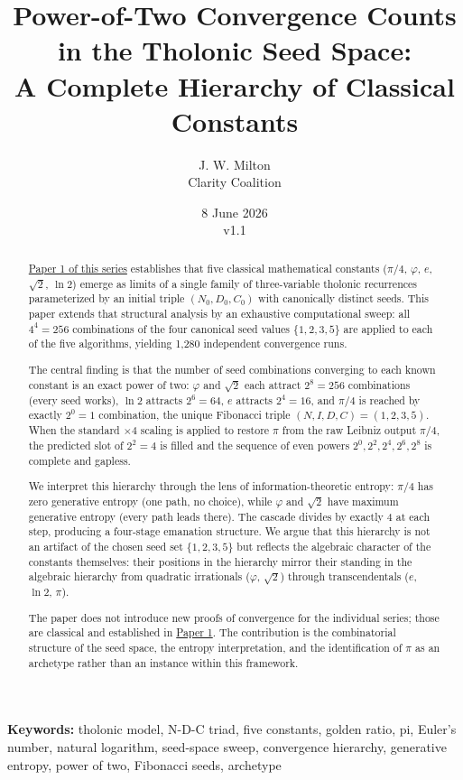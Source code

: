 \documentclass[12pt]{article}
\title{Power-of-Two Convergence Counts in the Tholonic Seed Space:\\
\large A Complete Hierarchy of Classical Constants}
\author{J. W. Milton\\[4pt]{\small Clarity Coalition}}
\date{\small 8 June 2026 \\ v1.1}
\begin{document}
\maketitle

\noindent\textbf{Keywords:} tholonic model, N-D-C triad, five constants, golden ratio, pi, Euler's number, natural logarithm, seed-space sweep, convergence hierarchy, generative entropy, power of two, Fibonacci seeds, archetype

\begin{abstract}
\href{https://github.com/baardev/truevalue/blob/main/docnav/Research/papers/1_recursive-tholonic-five-constants/1_recursive-tholonic-five-constants.pdf}{Paper
1 of this series} establishes that five classical mathematical constants
(\(\pi/4\), \(\varphi\), \(e\), \(\sqrt{2}\), \(\ln 2\)) emerge as
limits of a single family of three-variable tholonic recurrences
parameterized by an initial triple \((N_0, D_0, C_0)\) with canonically
distinct seeds. This paper extends that structural analysis by an
exhaustive computational sweep: all \(4^4 = 256\) combinations of the
four canonical seed values \(\{1, 2, 3, 5\}\) are applied to each of the
five algorithms, yielding 1,280 independent convergence runs.

The central finding is that the number of seed combinations converging
to each known constant is an exact power of two: \(\varphi\) and
\(\sqrt{2}\) each attract \(2^8 = 256\) combinations (every seed works),
\(\ln 2\) attracts \(2^6 = 64\), \(e\) attracts \(2^4 = 16\), and
\(\pi/4\) is reached by exactly \(2^0 = 1\) combination, the unique
Fibonacci triple \((N, I, D, C) = (1, 2, 3, 5)\). When the standard
\(\times 4\) scaling is applied to restore \(\pi\) from the raw Leibniz
output \(\pi/4\), the predicted slot of \(2^2 = 4\) is filled and the
sequence of even powers \(2^0, 2^2, 2^4, 2^6, 2^8\) is complete and
gapless.

We interpret this hierarchy through the lens of information-theoretic
entropy: \(\pi/4\) has zero generative entropy (one path, no choice),
while \(\varphi\) and \(\sqrt{2}\) have maximum generative entropy
(every path leads there). The cascade divides by exactly 4 at each step,
producing a four-stage emanation structure. We argue that this hierarchy
is not an artifact of the chosen seed set \(\{1, 2, 3, 5\}\) but
reflects the algebraic character of the constants themselves: their
positions in the hierarchy mirror their standing in the algebraic
hierarchy from quadratic irrationals (\(\varphi\), \(\sqrt{2}\)) through
transcendentals (\(e\), \(\ln 2\), \(\pi\)).

The paper does not introduce new proofs of convergence for the
individual series; those are classical and established in
\href{https://github.com/baardev/truevalue/blob/main/docnav/Research/papers/1_recursive-tholonic-five-constants/1_recursive-tholonic-five-constants.pdf}{Paper
1}. The contribution is the combinatorial structure of the seed space,
the entropy interpretation, and the identification of \(\pi\) as an
archetype rather than an instance within this framework.
\end{abstract}
\end{document}
